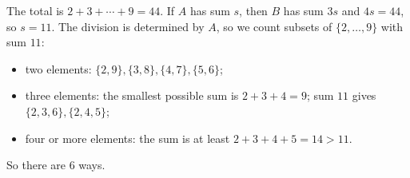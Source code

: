 The total is \(2+3+\cdots+9=44\). If \(A\) has sum \(s\), then \(B\) has sum \(3s\) and \(4s=44\), so \(s=11\). The division is determined by \(A\), so we count subsets of \(\{2,\dots,9\}\) with sum \(11\):
\begin{itemize}
\item two elements: \(\{2,9\},\{3,8\},\{4,7\},\{5,6\}\);
\item three elements: the smallest possible sum is \(2+3+4=9\); sum \(11\) gives \(\{2,3,6\},\{2,4,5\}\);
\item four or more elements: the sum is at least \(2+3+4+5=14>11\).
\end{itemize}
So there are \(\boxed{6}\) ways.
